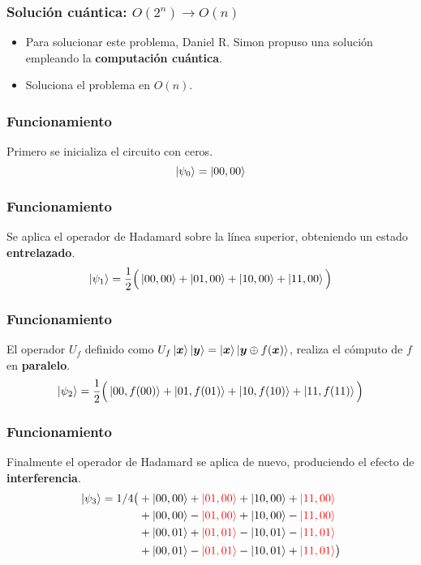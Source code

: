 \begin{frame}
\frametitle{Solución cuántica: $O(2^n) \rightarrow O(n)$}
\begin{itemize}
\item Para solucionar este problema, Daniel R. Simon propuso una solución 
empleando la \textbf{computación cuántica}.
\item Soluciona el problema en $O(n)$.
\end{itemize}



\end{frame}
\begin{frame}[t]
\frametitle{Funcionamiento}

Primero se inicializa el circuito con ceros.
$$ \ket{\psi_0} = \ket{00,00} $$
\end{frame}
\begin{frame}[t]
\frametitle{Funcionamiento}

Se aplica el operador de Hadamard sobre la línea superior, obteniendo un estado 
\textbf{entrelazado}.
$$
\ket{\psi_1} = \frac{1}{2} \Big(\ket{00,00} + \ket{01,00} + \ket{10,00} + 
\ket{11,00} \Big)
$$
\end{frame}
\begin{frame}[t]
\frametitle{Funcionamiento}

El operador $U_f$ definido como $ U_f \ket{\boldsymbol{x}} \ket{\boldsymbol{y}} = \ket{\boldsymbol{x}} \ket{\boldsymbol{y} \oplus f(\boldsymbol{x})} $, realiza el cómputo de $f$ en \textbf{paralelo}.
$$
	\ket{\psi_2} = \frac{1}{2} \Big(\ket{00,f(00)} + \ket{01,f(01)} + 
\ket{10,f(10)} + \ket{11,f(11)}\Big)
$$
\end{frame}
\begin{frame}[t]
\frametitle{Funcionamiento}

Finalmente el operador de Hadamard se aplica de nuevo, produciendo el efecto de 
\textbf{interferencia}.
\begin{equation*}
\begin{split}
\ket{\psi_3} = 1/4 \big( &
		+ \ket{00,00} + {\color{red} {\ket{01,00}}}+ \ket{10,00} + {\color{red} {\ket{11,00}}}\\
	& + \ket{00,00} - {\color{red} {\ket{01,00}}}+ \ket{10,00} - {\color{red} {\ket{11,00}}}\\
	& + \ket{00,01} + {\color{red} {\ket{01,01}}}- \ket{10,01} - {\color{red} {\ket{11,01}}}\\
	& + \ket{00,01} - {\color{red} {\ket{01,01}}}- \ket{10,01} + {\color{red} {\ket{11,01}}}
	\big)
\end{split}
\end{equation*}
\end{frame}
